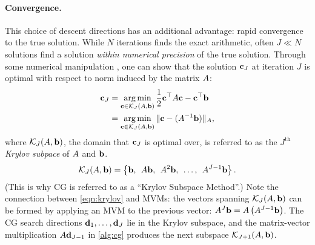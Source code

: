 

\paragraph{Convergence.}
This choice of descent directions has an additional advantage: rapid convergence to the true solution.
While $N$ iterations finds the exact arithmetic, often $J \ll N$ solutions find a solution \emph{within numerical precision} of the true solution.
Through some numerical manipulation \citep[see][]{golub2012matrix}, one can show that the solution $\mathbf{c}_J$ at iteration $J$ is optimal with respect to norm induced by the matrix $A$:
%
\begin{align}
  \mathbf{c}_J
  &= \operatorname*{arg\,min}_{\mathbf{c} \in \mathcal{K}_J (A, \mathbf{b})} \frac{1}{2} \mathbf{c}^\top A \mathbf{c} - \mathbf{c}^\top \mathbf{b}
  \nonumber \\
  &= \operatorname*{arg\,min}_{\mathbf{c} \in \mathcal{K}_J (A, \mathbf{b})} \Vert \mathbf{c} - (A^{-1} \mathbf{b}) \Vert_{A},
  \label{eqn:cg_optimality}
\end{align}
%
where $\mathcal{K}_J (A, \mathbf{b})$, the domain that $\mathbf{c}_J$ is optimal over, is referred to as the $J^\text{th}$ \emph{Krylov subpace} of $A$ and $\mathbf{b}$.
%
\begin{equation}
  \mathcal{K}_J (A, \mathbf{b}) = \left\{ \mathbf{b}, \:\: A \mathbf{b}, \:\: A^2 \mathbf{b}, \:\: \ldots, \:\: A^{J-1} \mathbf{b} \right\}.
  \label{eqn:krylov}
\end{equation}
%
(This is why CG is referred to as a ``Krylov Subspace Method''.)
Note the connection between \cref{eqn:krylov} and MVMs:
the vectors spanning $\mathcal{K}_J (A, \mathbf{b})$ can be formed by applying an MVM to the previous vector: $A^J \mathbf{b} = A \left( A^{J-1} \mathbf{b} \right)$.
The CG search directions $\mathbf{d}_1, \ldots, \mathbf{d}_J$ lie in the Krylov subspace, and the matrix-vector multiplication $A \mathbf{d}_{J-1}$ in \cref{alg:cg} produces the next subspace $\mathcal{K}_{J+1} (A, \mathbf{b})$.

